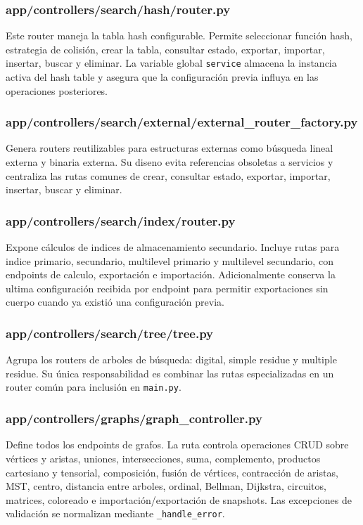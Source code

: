 \documentclass[12pt,onecolumn]{IEEEtran}
\begin{document}
\subsubsection{app/controllers/search/hash/router.py}
Este router maneja la tabla hash configurable. Permite seleccionar función hash, estrategia de colisión, crear la tabla, consultar estado, exportar, importar, insertar, buscar y eliminar. La variable global \texttt{service} almacena la instancia activa del hash table y asegura que la configuración previa influya en las operaciones posteriores.

\subsubsection{app/controllers/search/external/external\_router\_factory.py}
Genera routers reutilizables para estructuras externas como búsqueda lineal externa y binaria externa. Su diseno evita referencias obsoletas a servicios y centraliza las rutas comunes de crear, consultar estado, exportar, importar, insertar, buscar y eliminar.

\subsubsection{app/controllers/search/index/router.py}
Expone cálculos de indices de almacenamiento secundario. Incluye rutas para indice primario, secundario, multilevel primario y multilevel secundario, con endpoints de calculo, exportación e importación. Adicionalmente conserva la ultima configuración recibida por endpoint para permitir exportaciones sin cuerpo cuando ya existió una configuración previa.

\subsubsection{app/controllers/search/tree/tree.py}
Agrupa los routers de arboles de búsqueda: digital, simple residue y multiple residue. Su única responsabilidad es combinar las rutas especializadas en un router común para inclusión en \texttt{main.py}.

\subsubsection{app/controllers/graphs/graph\_controller.py}
Define todos los endpoints de grafos. La ruta controla operaciones CRUD sobre vértices y aristas, uniones, intersecciones, suma, complemento, productos cartesiano y tensorial, composición, fusión de vértices, contracción de aristas, MST, centro, distancia entre arboles, ordinal, Bellman, Dijkstra, circuitos, matrices, coloreado e importación/exportación de snapshots. Las excepciones de validación se normalizan mediante \texttt{\_handle\_error}.
\end{document}
